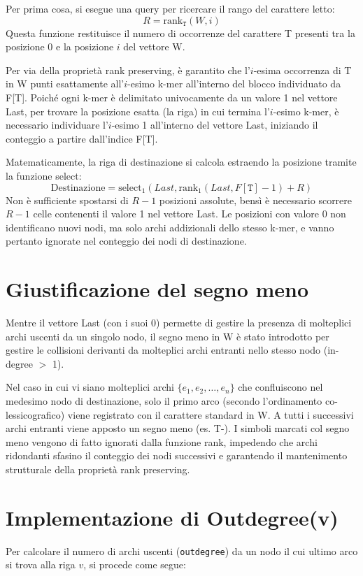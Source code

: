 \documentclass[a4paper,11pt]{article}
\begin{document}
Per prima cosa, si esegue una query per ricercare il rango del carattere letto:
$$ R = \text{rank}_{\texttt{T}}(W, i) $$
Questa funzione restituisce il numero di occorrenze del carattere T presenti tra la posizione 0 e la posizione $i$ del vettore W. 

Per via della proprietà rank preserving, è garantito che l'$i$-esima occorrenza di T in W punti esattamente all'$i$-esimo k-mer all'interno del blocco individuato da F[T]. Poiché ogni k-mer è delimitato univocamente da un valore 1 nel vettore Last, per trovare la posizione esatta (la riga) in cui termina l'$i$-esimo k-mer, è necessario individuare l'$i$-esimo 1 all'interno del vettore Last, iniziando il conteggio a partire dall'indice F[T].

Matematicamente, la riga di destinazione si calcola estraendo la posizione tramite la funzione select:
$$ \text{Destinazione} = \text{select}_1(Last, \text{rank}_1(Last, F[\texttt{T}] - 1) + R) $$
Non è sufficiente spostarsi di $R-1$ posizioni assolute, bensì è necessario scorrere $R-1$ celle contenenti il valore 1 nel vettore Last. Le posizioni con valore 0 non identificano nuovi nodi, ma solo archi addizionali dello stesso k-mer, e vanno pertanto ignorate nel conteggio dei nodi di destinazione.

\section{Giustificazione del segno meno}
Mentre il vettore Last (con i suoi 0) permette di gestire la presenza di molteplici archi uscenti da un singolo nodo, il segno meno in W è stato introdotto per gestire le collisioni derivanti da molteplici archi entranti nello stesso nodo (in-degree $>$ 1).

Nel caso in cui vi siano molteplici archi $\{e_1, e_2, \dots, e_n\}$ che confluiscono nel medesimo nodo di destinazione, solo il primo arco (secondo l'ordinamento co-lessicografico) viene registrato con il carattere standard in W. A tutti i successivi archi entranti viene apposto un segno meno (es. T-). 
I simboli marcati col segno meno vengono di fatto ignorati dalla funzione rank, impedendo che archi ridondanti sfasino il conteggio dei nodi successivi e garantendo il mantenimento strutturale della proprietà rank preserving.

\section{Implementazione di Outdegree(v)}
Per calcolare il numero di archi uscenti (\texttt{outdegree}) da un nodo il cui ultimo arco si trova alla riga $v$, si procede come segue:
\end{document}

